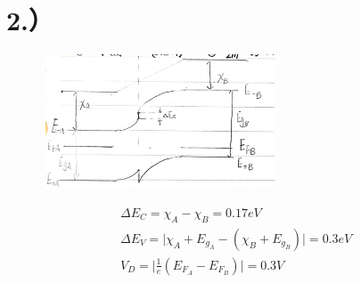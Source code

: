 \documentclass[UTF8]{ctexart}
\begin{document}
\section*{2.）}
\begin{figure}[H]                                        
    \centering                                                
    \includegraphics[width=7cm,height=4cm]{ans-2.jpg}        
    \caption*{}                                                                                   
\end{figure}
\begin{equation*}
    \begin{aligned}
        & \Delta E_C=\chi_A-\chi_B=0.17eV\\
        & \Delta E_V=\lvert \chi_A+E_{g_A}-(\chi_B+E_{g_B}) \rvert=0.3eV\\
        & V_D=\lvert \frac{1}{e}(E_{F_A}-E_{F_B}) \rvert=0.3V\\
    \end{aligned}
\end{equation*}
\end{document}
